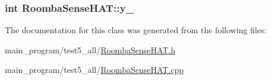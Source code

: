 \subsubsection[{\texorpdfstring{y\+\_\+}{y_}}]{\setlength{\rightskip}{0pt plus 5cm}int Roomba\+Sense\+H\+A\+T\+::y\+\_\+\hspace{0.3cm}{\ttfamily [protected]}}\hypertarget{class_roomba_sense_h_a_t_a3732a5d17f708fd18959beb0a4123d25}{}\label{class_roomba_sense_h_a_t_a3732a5d17f708fd18959beb0a4123d25}


The documentation for this class was generated from the following files\+:\begin{DoxyCompactItemize}
\item 
main\+\_\+program/test5\+\_\+all/\hyperlink{_roomba_sense_h_a_t_8h}{Roomba\+Sense\+H\+A\+T.\+h}\item 
main\+\_\+program/test5\+\_\+all/\hyperlink{_roomba_sense_h_a_t_8cpp}{Roomba\+Sense\+H\+A\+T.\+cpp}\end{DoxyCompactItemize}
